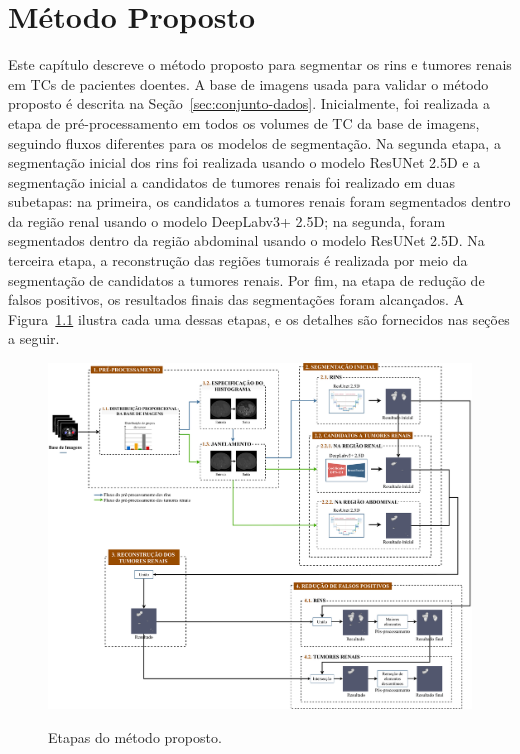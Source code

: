 \chapter{Método Proposto}
\label{cap:materiais-metodo}
\phantom{0}

Este capítulo descreve o método proposto para segmentar os rins e tumores renais em TCs de pacientes doentes. A base de imagens usada para validar o método proposto é descrita na Seção~\ref{sec:conjunto-dados}. Inicialmente, foi realizada a etapa de pré-processamento em todos os volumes de TC da base de imagens, seguindo fluxos diferentes para os modelos de segmentação. Na segunda etapa, a segmentação inicial dos rins foi realizada usando o modelo ResUNet 2.5D e a segmentação inicial a candidatos de tumores renais foi realizado em duas subetapas: na primeira, os candidatos a tumores renais foram segmentados dentro da região renal usando o modelo DeepLabv3+ 2.5D; na segunda, foram segmentados dentro da região abdominal usando o modelo ResUNet 2.5D. Na terceira etapa, a reconstrução das regiões tumorais é realizada por meio da segmentação de candidatos a tumores renais. Por fim, na etapa de redução de falsos positivos, os resultados finais das segmentações foram alcançados. A Figura~\ref{fig:EtapasM} ilustra cada uma dessas etapas, e os detalhes são fornecidos nas seções a seguir.



\begin{figure}[ht!]
    \centering
    \caption{Etapas do método proposto.}
    \includegraphics[width=1\textwidth]{figuras/metodo-proposto.pdf}
    \label{fig:EtapasM}
\end{figure}

